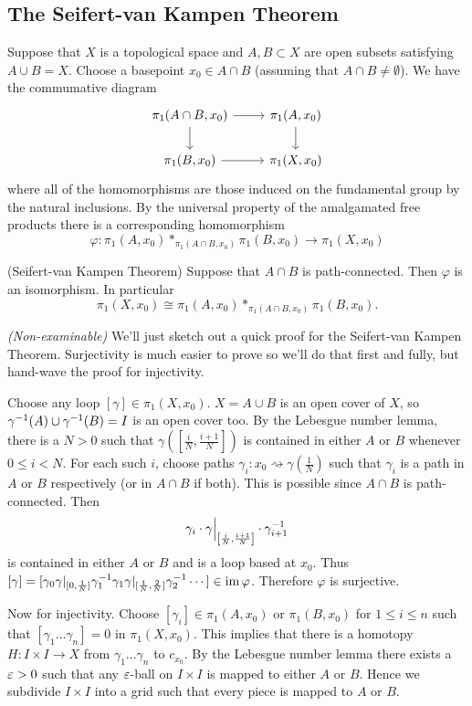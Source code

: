 \documentclass{article}
\begin{document}
\subsection{The Seifert-van Kampen Theorem}
Suppose that $ X $ is a topological space and $ A,B\subset X $ are open subsets satisfying $ A\cup B = X $. Choose a basepoint $ x_0\in A \cap B $ (assuming that $ A\cap B \ne \emptyset $). We have the commumative diagram
\[
  \begin{tikzcd}
\pi_1(A \cap B, x_0) \arrow[r] \arrow[d] & \pi_1(A, x_0) \arrow[d] \\
\pi_1(B, x_0) \arrow[r] & \pi_1(X, x_0)
\end{tikzcd}
\]
where all of the homomorphisms are those induced on the fundamental group by the natural inclusions. By the universal property of the amalgamated free products there is a corresponding homomorphism
\[
	\varphi: \pi_1(A,x_0) *_{\pi_1(A\cap B,x_0)} \pi_1(B,x_0) \to \pi_1(X,x_0)
\]
\begin{theorem}
	(Seifert-van Kampen Theorem) Suppose that $ A\cap B $ is path-connected. Then $ \varphi $ is an isomorphism. In particular
	\[
		\pi_1(X,x_0) \cong \pi_1(A,x_0) *_{\pi_1(A\cap B,x_0)} \pi_1(B,x_0).
	\]
\end{theorem}
\pf \textit{(Non-examinable)} We'll just sketch out a quick proof for the Seifert-van Kampen Theorem. Surjectivity is much easier to prove so we'll do that first and fully, but hand-wave the proof for injectivity.\par
Choose any loop $ [\gamma] \in \pi_1(X,x_0) $. $ X = A\cup B $ is an open cover of $ X $, so $ {\gamma}^{-1}(A) \cup {\gamma}^{-1}(B) = I $ is an open cover too. By the Lebesgue number lemma, there is a $ N> 0 $ such that $ \gamma\left(\left[ \frac iN, \frac{i+1} N \right]\right) $ is contained in either $ A $ or $ B $ whenever $ 0\le i < N $. For each such $ i $, choose paths $ \gamma_i: x_0\rightsquigarrow \gamma\left(\frac 1N\right) $ such that $ \gamma_i $ is a path in $ A $ or $ B $ respectively (or in $ A\cap B $ if both). This is possible since $ A\cap B $ is path-connected. Then
\[
	\gamma_i \cdot \gamma\Big|_{\left[\frac iN, \frac{i+1}N \right]} \cdot {\gamma}^{-1}_{i+1}
\]
is contained in either $ A $ or $ B $ and is a loop based at $ x_0 $. Thus $ [\gamma]=[\gamma_0\gamma|_{[0,\frac 1N]} {\gamma}^{-1}_1\gamma_1 \gamma|_{[\frac 1N,\frac 2N]} \gamma_2^{-1} \cdots ] \in \operatorname{im} \varphi $. Therefore $ \varphi $ is surjective.
\par
Now for injectivity. Choose $ [\gamma_i]\in \pi_1(A,x_0) $ or $ \pi_1(B,x_0) $ for $ 1\le i \le n $ such that $ [\gamma_1 \dots \gamma_n] = 0 $ in $ \pi_1(X,x_0) $. This implies that there is a homotopy $ H:I\times I \to X $ from $ \gamma_1\dots \gamma_n $ to $ c_{x_0} $. By the Lebesgue number lemma there exists a $ \varepsilon>0 $ such that any $ \varepsilon $-ball on $ I\times I $ is mapped to either $ A $ or $ B $. Hence we subdivide $ I\times I $ into a grid such that every piece is mapped to $ A $ or $ B $.
\end{document}
